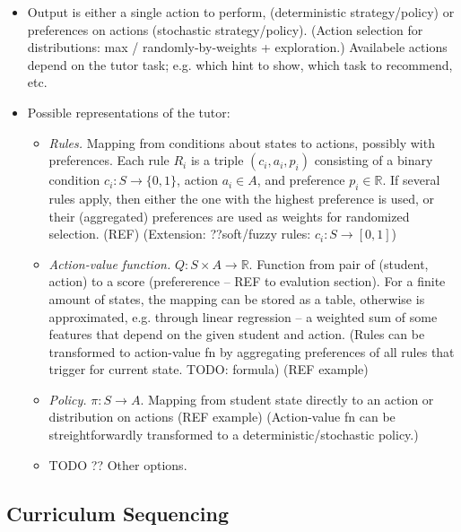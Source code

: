 \begin{itemize}
\item Output is either a single action to perform,
  (deterministic strategy/policy)
  or preferences on actions (stochastic strategy/policy).
  (Action selection for distributions: max / randomly-by-weights +
  exploration.)
  Availabele actions depend on the tutor task;
  e.g. which hint to show, which task to recommend, etc.
\item Possible representations of the tutor:
\begin{itemize}
\item \emph{Rules.}
  Mapping from conditions about states to actions, possibly with preferences.
  Each rule $R_i$ is a triple $(c_i, a_i, p_i)$
  consisting of a binary condition $c_i: S \rightarrow \{0, 1\}$,
  action $a_i \in A$, and preference $p_i \in \mathbb{R}$.
  If several rules apply, then either the one with the highest preference is used,
  or their (aggregated) preferences are used as weights for randomized selection.
  (REF)
  (Extension: ??soft/fuzzy rules: $c_i: S\rightarrow [0, 1]$)
\item \emph{Action-value function.}  %
  $Q: S \times A \rightarrow \mathbb{R}$.
  Function from pair of (student, action) to a score
  (prefererence -- REF to evalution section).
  For a finite amount of states, the mapping can be stored as a table,
  otherwise is approximated, e.g. through linear regression -- a weighted sum
  of some features that depend on the given student and action.
  (Rules can be transformed to action-value fn by aggregating preferences of
  all rules that trigger for current state. TODO: formula)
  (REF example)
\item \emph{Policy.}  %
  $\pi: S \rightarrow A$.
  Mapping from student state directly to an action or distribution on actions
  (REF example)
  (Action-value fn can be streightforwardly transformed to a
  deterministic/stochastic policy.)
\item TODO ?? Other options.
\end{itemize}
\end{itemize}


\subsection{Curriculum Sequencing}

